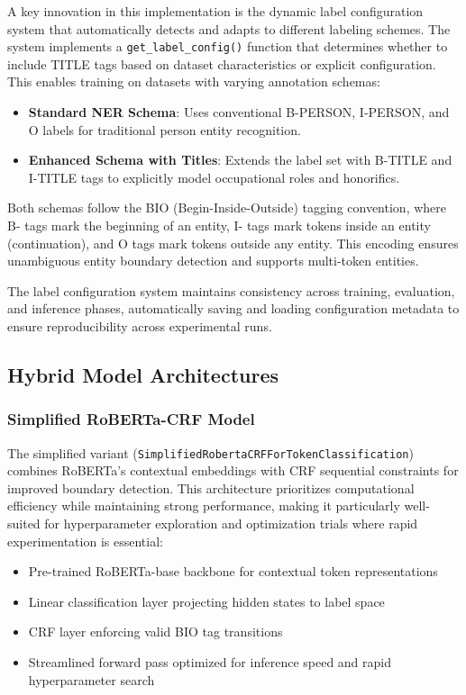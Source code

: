 \documentclass[a4paper]{usiinfbachelorproject}
\begin{document}
A key innovation in this implementation is the dynamic label configuration system that automatically detects and adapts to different labeling schemes. The system implements a \texttt{get\_label\_config()} function that determines whether to include TITLE tags based on dataset characteristics or explicit configuration. This enables training on datasets with varying annotation schemas:

\begin{itemize}
    \item \textbf{Standard NER Schema}: Uses conventional B-PERSON, I-PERSON, and O labels for traditional person entity recognition.
    \item \textbf{Enhanced Schema with Titles}: Extends the label set with B-TITLE and I-TITLE tags to explicitly model occupational roles and honorifics.
\end{itemize}

Both schemas follow the BIO (Begin-Inside-Outside) tagging convention, where B- tags mark the beginning of an entity, I- tags mark tokens inside an entity (continuation), and O tags mark tokens outside any entity. This encoding ensures unambiguous entity boundary detection and supports multi-token entities.

The label configuration system maintains consistency across training, evaluation, and inference phases, automatically saving and loading configuration metadata to ensure reproducibility across experimental runs.

\subsection{Hybrid Model Architectures}

\subsubsection{Simplified RoBERTa-CRF Model}

The simplified variant (\texttt{SimplifiedRobertaCRFForTokenClassification}) combines RoBERTa's contextual embeddings with CRF sequential constraints for improved boundary detection. This architecture prioritizes computational efficiency while maintaining strong performance, making it particularly well-suited for hyperparameter exploration and optimization trials where rapid experimentation is essential:

\begin{itemize}
    \item Pre-trained RoBERTa-base backbone for contextual token representations
    \item Linear classification layer projecting hidden states to label space
    \item CRF layer enforcing valid BIO tag transitions
    \item Streamlined forward pass optimized for inference speed and rapid hyperparameter search
\end{itemize}
\end{document}
